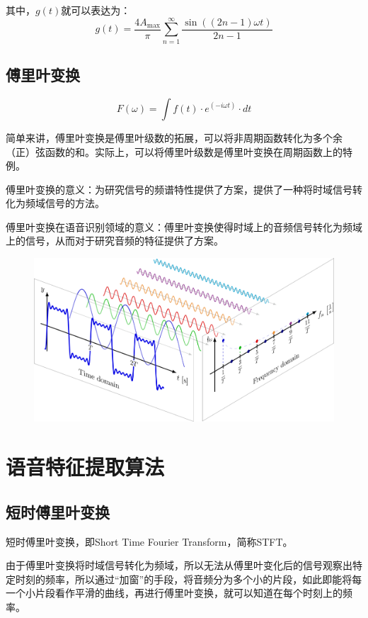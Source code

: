 \documentclass[lang=cn]{elegantpaper}
\begin{document}
其中，$g(t)$就可以表达为：
\begin{equation}
    g(t)=\frac{4A_{\max}}{\pi}\sum_{n=1}^{\infty}\frac{\sin((2n-1)\omega t)}{2n-1}
\end{equation}
\subsection{傅里叶变换}
\begin{equation}
    F(\omega)=\int f(t)\cdot e^{(-i\omega t)}\cdot dt
\end{equation}

简单来讲，傅里叶变换是傅里叶级数的拓展，可以将非周期函数转化为多个余（正）弦函数的和。实际上，可以将傅里叶级数是傅里叶变换在周期函数上的特例。

傅里叶变换的意义：为研究信号的频谱特性提供了方案，提供了一种将时域信号转化为频域信号的方法。

傅里叶变换在语音识别领域的意义：傅里叶变换使得时域上的音频信号转化为频域上的信号，从而对于研究音频的特征提供了方案。
\begin{figure}
    \centering
    \includegraphics[scale=0.05]{Fourier Transform.png}
\end{figure}
\section{语音特征提取算法}
\subsection{短时傅里叶变换}
短时傅里叶变换，即Short Time Fourier Transform，简称STFT。

由于傅里叶变换将时域信号转化为频域，所以无法从傅里叶变化后的信号观察出特定时刻的频率，所以通过“加窗”的手段，将音频分为多个小的片段，如此即能将每一个小片段看作平滑的曲线，再进行傅里叶变换，就可以知道在每个时刻上的频率。
\end{document}
